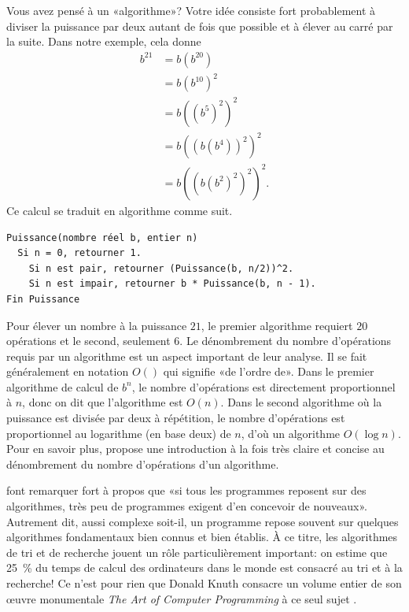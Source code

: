 
Vous avez pensé à un «algorithme»? Votre idée consiste fort
probablement à diviser la puissance par deux autant de fois que
possible et à élever au carré par la suite. Dans notre exemple, cela
donne
\begin{align*}
  b^{21}
  &= b (b^{20}) \\
  & = b (b^{10})^2 \\
  &= b ((b^5)^2)^2 \\
  & = b ((b (b^4))^2)^2 \\
  &= b ((b (b^2)^2)^2)^2.
\end{align*}
Ce calcul se traduit en algorithme comme suit.

\begin{Schunk}
\begin{Verbatim}
Puissance(nombre réel b, entier n)
  Si n = 0, retourner 1.
    Si n est pair, retourner (Puissance(b, n/2))^2.
    Si n est impair, retourner b * Puissance(b, n - 1).
Fin Puissance
\end{Verbatim}
\end{Schunk}

Pour élever un nombre à la puissance $21$, le premier algorithme
requiert $20$ opérations et le second, seulement $6$. Le dénombrement
du nombre d'opérations requis par un algorithme est un aspect
important de leur analyse. Il se fait généralement en notation $O()$
qui signifie «de l'ordre de». Dans le premier algorithme de calcul de
$b^n$, le nombre d'opérations est directement proportionnel à $n$,
donc on dit que l'algorithme est $O(n)$. Dans le second algorithme où
la puissance est divisée par deux à répétition, le nombre d'opérations
est proportionnel au logarithme (en base deux) de $n$, d'où un
algorithme $O(\log n)$. Pour en savoir plus,
\citet[chapitre~1]{Stephens:algorithms:2013} propose une introduction
à la fois très claire et concise au dénombrement du nombre
d'opérations d'un algorithme.

\citet{Kernighan:practice:1999} font remarquer fort à propos que «si
tous les programmes reposent sur des algorithmes, très peu de
programmes exigent d'en concevoir de nouveaux». Autrement dit, aussi
complexe soit-il, un programme repose souvent sur quelques algorithmes
fondamentaux bien connus et bien établis. À ce titre, les algorithmes
de tri et de recherche jouent un rôle particulièrement important: on
estime que 25~\% du temps de calcul des ordinateurs dans le monde est
consacré au tri et à la recherche! Ce n'est pour rien que Donald Knuth
consacre un volume entier de son œuvre monumentale \emph{The Art of
  Computer Programming} à ce seul sujet \citep{Knuth:ACP:vol1:1997}.


